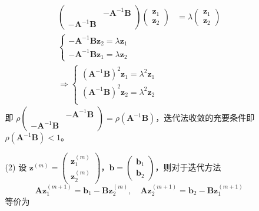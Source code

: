 \documentclass{sjtuarticle}
\begin{document}
\begin{itemize}
\begin{solution}
\begin{itemize}
\begin{align*}
                \begin{pmatrix}
                    & -\bm{A}^{-1}\bm{B} \\ -\bm{A}^{-1}\bm{B} 
                \end{pmatrix}\begin{pmatrix}\bm{z}_1\\\bm{z}_2\end{pmatrix}&=\lambda\begin{pmatrix}\bm{z}_1\\\bm{z}_2\end{pmatrix}\\
                \begin{cases}
                    -\bm{A}^{-1}\bm{B}\bm{z}_2=\lambda \bm{z}_1 \\
                    -\bm{A}^{-1}\bm{B}\bm{z}_1=\lambda \bm{z}_2
                \end{cases}\\
                \Rightarrow \begin{cases}
                    (\bm{A}^{-1}\bm{B})^2 \bm{z}_1=\lambda^2 \bm{z}_1\\
                    (\bm{A}^{-1}\bm{B})^2 \bm{z}_2=\lambda^2 \bm{z}_2\\
                \end{cases}
            \end{align*}
            即 $\rho\begin{pmatrix}
                & -\bm{A}^{-1}\bm{B} \\ -\bm{A}^{-1}\bm{B} 
            \end{pmatrix}=\rho(\bm{A}^{-1}\bm{B})$，迭代法收敛的充要条件即 $\rho(\bm{A}^{-1}\bm{B})<1$。
            \item[(2)] 设 $\bm{z}^{(m)}=\begin{pmatrix}
                \bm{z}_1^{(m)} \\ \bm{z}_2^{(m)}
            \end{pmatrix}$，$\bm{b}=\begin{pmatrix}
                \bm{b}_1 \\ \bm{b}_2
            \end{pmatrix}$，则对于迭代方法
            \begin{equation*}
                \bm{A}\bm{z}_1^{(m+1)}=\bm{b}_1-\bm{B}\bm{z}_2^{(m)},\quad \bm{A}\bm{z}_2^{(m+1)}=\bm{b}_2-\bm{B}\bm{z}_1^{(m+1)}
            \end{equation*}
            等价为
            \begin{align*}

\end{align*}
\end{itemize}
\end{solution}
\end{itemize}
\end{document}

